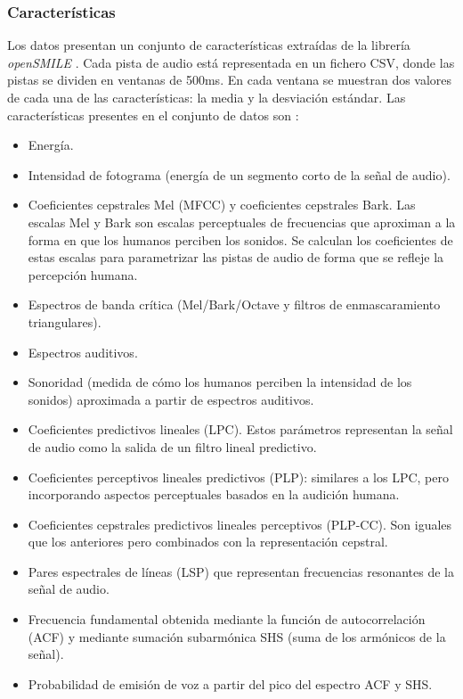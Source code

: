 \documentclass[12pt,a4paper]{article}
\begin{document}
\subsubsection{Características}
Los datos presentan un conjunto de características extraídas de la librería \textit{openSMILE} \cite{openSMILE}. Cada pista de audio está representada en un fichero CSV, donde las pistas se dividen en ventanas de 500ms. En cada ventana se muestran dos valores de cada una de las características: la media y la desviación estándar. Las características presentes en el conjunto de datos son \cite{openSMILEfeatures}:
\begin{itemize}
	\item Energía.
	\item Intensidad de fotograma (energía de un segmento corto de la señal de audio).
	\item Coeficientes cepstrales Mel (MFCC) y coeficientes cepstrales Bark. Las escalas Mel y Bark son escalas perceptuales de frecuencias que aproximan a la forma en que los humanos perciben los sonidos. Se calculan los coeficientes de estas escalas para parametrizar las pistas de audio de forma que se refleje la percepción humana.
	\item Espectros de banda crítica (Mel/Bark/Octave y filtros de enmascaramiento triangulares).
	\item Espectros auditivos.
	\item Sonoridad (medida de cómo los humanos perciben la intensidad de los sonidos) aproximada a partir de espectros auditivos.
	\item Coeficientes predictivos lineales (LPC). Estos parámetros representan la señal de audio como la salida de un filtro lineal predictivo.
	\item Coeficientes perceptivos lineales predictivos (PLP): similares a los LPC, pero incorporando aspectos perceptuales basados en la audición humana.
	\item Coeficientes cepstrales predictivos lineales perceptivos (PLP-CC). Son iguales que los anteriores pero combinados con la representación cepstral.
	\item Pares espectrales de líneas (LSP) que representan frecuencias resonantes de la señal de audio.
	\item Frecuencia fundamental obtenida mediante la función de autocorrelación (ACF) y mediante sumación subarmónica SHS (suma de los armónicos de la señal).
	\item Probabilidad de emisión de voz a partir del pico del espectro ACF y SHS.

\end{itemize}
\end{document}
